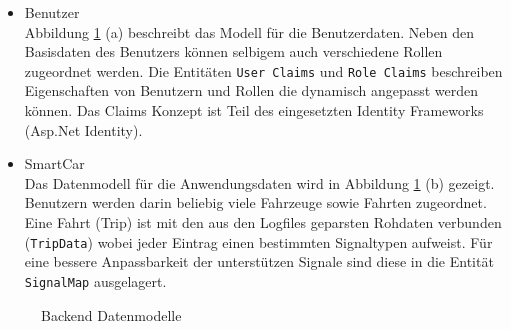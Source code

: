 \begin{itemize}
\item Benutzer \\
Abbildung \ref{fig:backendDatamodels} (a) beschreibt das Modell für die Benutzerdaten. Neben den Basisdaten des Benutzers können selbigem auch verschiedene Rollen zugeordnet werden. Die Entitäten \texttt{User Claims} und \texttt{Role Claims} beschreiben Eigenschaften von Benutzern und Rollen die dynamisch angepasst werden können. Das Claims Konzept ist Teil des eingesetzten Identity Frameworks (Asp.Net Identity).
\item SmartCar \\
Das Datenmodell für die Anwendungsdaten wird in Abbildung \ref{fig:backendDatamodels} (b) gezeigt. Benutzern werden darin beliebig viele Fahrzeuge sowie Fahrten zugeordnet. Eine Fahrt (Trip) ist mit den aus den Logfiles geparsten Rohdaten verbunden (\texttt{TripData}) wobei jeder Eintrag einen bestimmten Signaltypen aufweist. Für eine bessere Anpassbarkeit der unterstützen Signale sind diese in die Entität \texttt{SignalMap} ausgelagert.
\end{itemize}

\begin{figure} 
\caption{Backend Datenmodelle} 
\label{fig:backendDatamodels}
\end{figure} 


